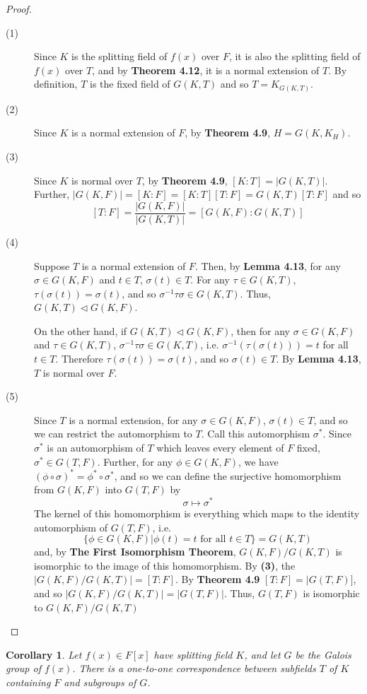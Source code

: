 \documentclass[12pt,leqno]{article}
\numberwithin{equation}{section}
\theoremstyle{plain}
\newtheorem{cor}[thm]{Corollary}
\theoremstyle{definition}
\theoremstyle{remark}
\begin{document}
\begin{proof}\indent
 \begin{description}
  \item [(1)] Since $K$ is the splitting field of $f(x)$ over $F$, it is also the splitting field of $f(x)$ over $T$, and by \textbf{Theorem 4.12}, it is a normal extension of $T$. By definition, $T$ is the fixed field of $G(K,T)$ and so $T=K_{G(K,T)}$.
  \item [(2)] Since $K$ is a normal extension of $F$, by \textbf{Theorem 4.9}, $H=G(K,K_H)$. 
  \item [(3)] Since $K$ is normal over $T$, by \textbf{Theorem 4.9}, $[K:T]=|G(K,T)|$. Further, $|G(K,F)|=[K:F]=[K:T][T:F]=G(K,T)[T:F]$ and so \[[T:F]=\frac{|G(K,F)|}{|G(K,T)|}=[G(K,F):G(K,T)]\]
 \item [(4)] Suppose $T$ is a normal extension of $F$. Then, by \textbf{Lemma 4.13}, for any $\sigma\in G(K,F)$ and $t\in T$, $\sigma(t)\in T$. For any $\tau\in G(K,T)$, $\tau(\sigma(t))=\sigma(t)$, and so $\sigma^{-1}\tau\sigma\in G(K,T)$. Thus, $G(K,T)\lhd G(K,F)$. 

On the other hand, if $G(K,T)\lhd G(K,F)$, then for any $\sigma\in G(K,F)$ and $\tau\in G(K,T)$, $\sigma^{-1}\tau\sigma\in G(K,T)$, i.e. $\sigma^{-1}(\tau(\sigma(t)))=t$ for all $t\in T$. Therefore $\tau(\sigma(t))=\sigma(t)$, and so $\sigma(t)\in T$. By \textbf{Lemma 4.13}, $T$ is normal over $F$. 
 \item [(5)] Since $T$ is a normal extension, for any $\sigma\in G(K,F)$, $\sigma(t)\in T$, and so we can restrict the automorphism to $T$. Call this automorphism $\sigma^*$. Since $\sigma^*$ is an automorphism of $T$ which leaves every element of $F$ fixed, $\sigma^*\in G(T,F)$. Further, for any $\phi\in G(K,F)$, we have $(\phi\circ\sigma)^*=\phi^*\circ\sigma^*$, and so we can define the surjective homomorphism from $G(K,F)$ into $G(T,F)$ by \[\sigma\mapsto\sigma^*\] The kernel of this homomorphism is everything which maps to the identity automorphism of $G(T,F)$, i.e. \[\{\phi\in G(K,F)|\phi(t)=t\text{ for all }t\in T\}=G(K,T)\] and, by \textbf{The First Isomorphism Theorem}, $G(K,F)/G(K,T)$ is isomorphic to the image of this homomorphism. By \textbf{(3)}, the $|G(K,F)/G(K,T)|=[T:F]$. By \textbf{Theorem 4.9} $[T:F]=|G(T,F)]$, and so $|G(K,F)/G(K,T)|=|G(T,F)|$. Thus, $G(T,F)$ is isomorphic to $G(K,F)/G(K,T)$\qedhere
 \end{description}
\end{proof}

\begin{cor}
 Let $f(x)\in F[x]$ have splitting field $K$, and let $G$ be the Galois group of $f(x)$. There is a one-to-one correspondence between subfields $T$ of $K$ containing $F$ and subgroups of $G$.
\end{cor}
\end{document}
